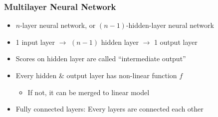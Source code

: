 \subsubsection*{Multilayer Neural Network}
\begin{itemize}
    \item $n$-layer neural network, or $(n-1)$-hidden-layer neural network
    \item 1 input layer $\rightarrow$ $(n-1)$ hidden layer $\rightarrow$ 1 output layer
    \item Scores on hidden layer are called ``intermediate output''
    \item Every hidden \& output layer has non-linear function $f$
    \begin{itemize}
        \item If not, it can be merged to linear model
    \end{itemize}
    \item Fully connected layers: Every layers are connected each other
\end{itemize}
\begin{figures}
\end{figures}
\clearpage

